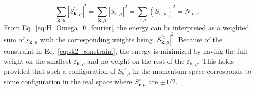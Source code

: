 \documentclass[twocolumn,superscriptaddress,amsmath,amssymb,aps,prx,nofootinbib]{revtex4-2}
\begin{document}
\begin{equation} \label{eq:sk2_constraint}
  \sum_{\mathbf{k},\mu} | S^{'z}_{\mathbf{k},\mu} |^2 = \sum_{\mathbf{k},\mu } |S^z_{\mathbf{k},\mu} |^2 =  \sum_{\mathbf{r},\mu} \left(  S^z_{\mathbf{r},\mu} \right)^2 = N_{\text{u.c.}} .
\end{equation}
From Eq.~\eqref{eq:H_Omega_0_fourier}, the energy can be interpreted as a weighted sum of $\varepsilon_{\mathbf{k},\mu}$ with the corresponding weights being $|S^{'z}_{\mathbf{k},\mu}|^2$. Because of the constraint in Eq.~\eqref{eq:sk2_constraint}, the energy is minimized by having the full weight on the smallest $\varepsilon_{\mathbf{k},\mu}$ and no weight on the rest of the $\varepsilon_{\mathbf{k},\mu}$. This holds provided that such a configuration of $S^{'z}_{\mathbf{k},\mu}$ in the momentum space corresponds to some configuration in the real space where $S^z_{\mathbf{r},\mu}$ are $\pm 1/2$.
\end{document}
